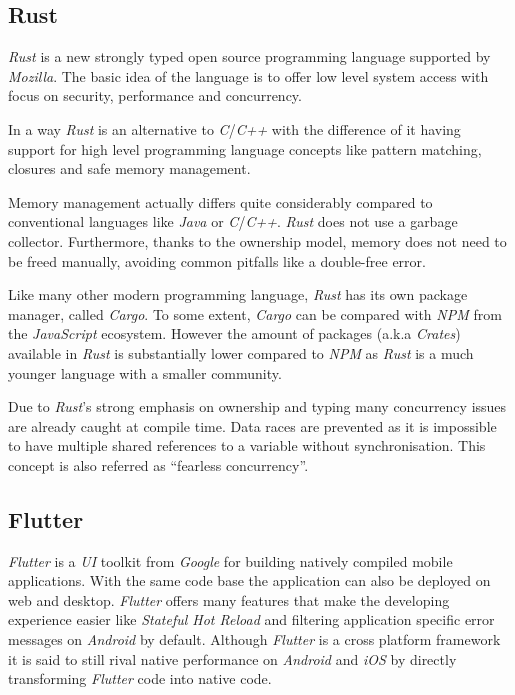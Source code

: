 \subsection{Rust}

\textit{Rust} is a new strongly typed open source programming language supported by
\textit{Mozilla}. The basic idea of the language is to offer low level system access with focus on
security, performance and concurrency. \cite{rustbook1, forkjoin}

In a way \textit{Rust} is an alternative to \textit{C}/\textit{C++} with the difference of it having
support for high level programming language concepts like pattern matching, closures and safe memory
management. \cite{rustbook1, forkjoin}

Memory management actually differs quite considerably compared to conventional languages like
\textit{Java} or \textit{C}/\textit{C++}. \textit{Rust} does not use a garbage collector.
Furthermore, thanks to the ownership model, memory does not need to be freed manually, avoiding
common pitfalls like a double-free error.

Like many other modern programming language, \textit{Rust} has its own package manager, called
\textit{Cargo}. To some extent, \textit{Cargo} can be compared with \textit{NPM} from the
\textit{JavaScript} ecosystem. However the amount of packages (a.k.a \textit{Crates}) available in
\textit{Rust} is substantially lower compared to \textit{NPM} as \textit{Rust} is a much younger
language with a smaller community.

Due to \textit{Rust}'s strong emphasis on ownership and typing many concurrency issues are already
caught at compile time. Data races are prevented as it is impossible to have multiple shared
references to a variable without synchronisation. This concept is also referred as “fearless
concurrency”. \cite{rustbook2}

\subsection{Flutter}

\textit{Flutter} is a \textit{UI} toolkit from \textit{Google} for building natively compiled mobile
applications. With the same code base the application can also be deployed on web and desktop.
\textit{Flutter} offers many features that make the developing experience easier like
\textit{Stateful Hot Reload} and filtering application specific error messages on \textit{Android}
by default. Although \textit{Flutter} is a cross platform framework it is said to still rival native
performance on \textit{Android} and \textit{iOS} by directly transforming \textit{Flutter} code into
native code.
\cite{flutter}

